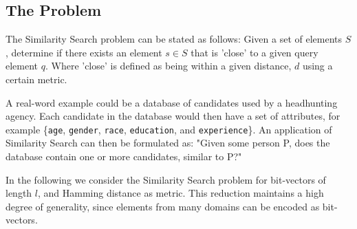 \documentclass[a4paper,11pt]{article}
\begin{document}
\subsection{The Problem}
The Similarity Search problem can be stated as follows: Given a set of elements $S$, determine if there exists an element $s \in S$ that is 'close' to a given query element $q$. Where 'close' is defined as being within a given distance, $d$ using a certain metric.

A real-word example could be a database of candidates used by a headhunting agency. Each candidate in the database would then have a set of attributes, for example \{\texttt{age}, \texttt{gender}, \texttt{race}, \texttt{education}, and \texttt{experience}\}.
An application of Similarity Search can then be formulated as: "Given some person P, does the database contain one or more candidates, similar to P?"

In the following we consider the Similarity Search problem for bit-vectors of length $l$, and Hamming distance as metric. This reduction maintains a high degree of generality, since elements from many domains can be encoded as bit-vectors.
\end{document}
